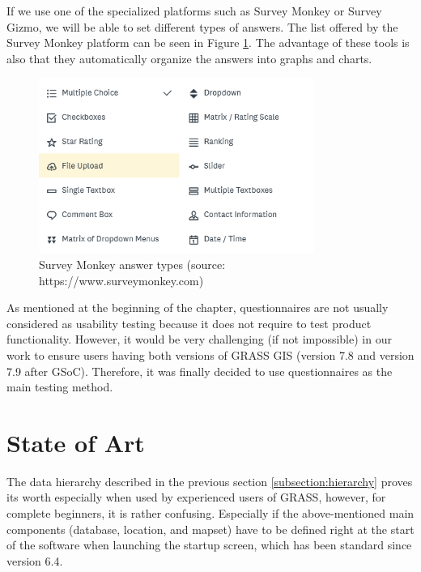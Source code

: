 \documentclass[a4paper,10pt,twoside]{article}
\begin{document}
\noindent If we use one of the specialized platforms such as Survey Monkey or Survey Gizmo, we will be able to set different types of answers. The list offered by the Survey Monkey platform can be seen in Figure \ref{fig:survey_monkey_options}. The advantage of these tools is also that they automatically organize the answers into graphs and charts.

\vspace{0.3cm}
\begin{figure}[hbt!] 
\begin{center}
\includegraphics[width=9cm]{../pictures/survey_monkey_options.png} 
\caption[Survey Monkey answer types ]{Survey Monkey answer types (source: https://www.surveymonkey.com)}
\label{fig:survey_monkey_options}
\end{center}
\end{figure}

\noindent As mentioned at the beginning of the chapter, questionnaires are not usually considered as usability testing because it does not require to test product functionality.
However, it would be very challenging (if not impossible) in our work to ensure users having both versions of GRASS GIS (version 7.8 and version 7.9 after GSoC). Therefore, it was finally decided to use questionnaires as the main testing method.

\newpage
\vspace*{-1cm}
\section{State of Art}
\label{State of Art}
\noindent
\large
The data hierarchy described in the previous section \ref{subsection:hierarchy} proves its worth especially when used by experienced users of GRASS, however, for complete beginners, it is rather confusing. Especially if the above-mentioned main components (database, location, and mapset) have to be defined right at the start of the software when launching the startup screen, which has been standard since version 6.4. 
\end{document}
